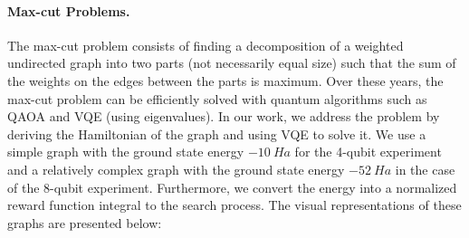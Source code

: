 \documentclass{article} %
\begin{document}
\paragraph{Max-cut Problems.} The max-cut problem \citep{poljak1995solving} consists of finding a decomposition of a weighted undirected graph into two parts (not necessarily equal size) such that the sum of the weights on the edges between the parts is maximum. Over these years, the max-cut problem can be efficiently solved with quantum algorithms such as QAOA \citep{villalba2021improvement} and VQE (using eigenvalues). In our work, we address the problem by deriving the Hamiltonian of the graph and using VQE to solve it. We use a simple graph with the ground state energy $-10 \ Ha$ for the 4-qubit experiment and a relatively complex graph with the ground state energy $-52 \ Ha$ in the case of the 8-qubit experiment. Furthermore, we convert the energy into a normalized reward function integral to the search process. The visual representations of these graphs are presented below:
\end{document}

